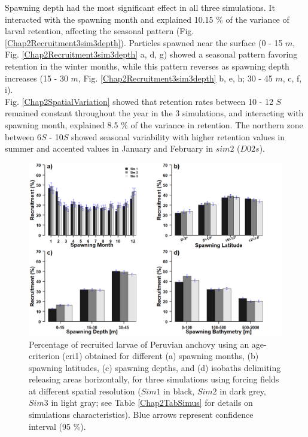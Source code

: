 Spawning depth had the most significant effect in all three simulations. It interacted with the spawning month and explained 10.15 \% of the variance of larval retention, affecting the seasonal pattern (Fig. \ref{Chap2Recruitment3sim3depth}). Particles spawned near the surface (0 - 15 $m$, Fig. \ref{Chap2Recruitment3sim3depth} a, d, g) showed a seasonal pattern favoring retention in the winter months, while this pattern reverses as spawning depth increases (15 - 30 $m$, Fig. \ref{Chap2Recruitment3sim3depth} b, e, h; 30 - 45 $m$, c, f, i).\\

Fig. \ref{Chap2SpatialVariation} showed that retention rates between 10 - 12 \textdegree $S$ remained constant throughout the year in the 3 simulations, and interacting with spawning month, explained 8.5 \% of the variance in retention. The northern zone between 6\textdegree $S$ - 10\textdegree $S$ showed seasonal variability with higher retention values in summer and accented values in January and February in $sim 2$ ($D02s$).\\

\begin{figure}[H]
	\includegraphics[width=1.0\textwidth]{figures/Chap2Recruitment3bars.png}
	\centering
	\caption{Percentage of recruited larvae of Peruvian anchovy using an age-criterion (\gls{cri1}) obtained for different (a) spawning months, (b) spawning latitudes, (c) spawning depths, and (d) isobaths delimiting releasing areas horizontally, for three simulations using forcing fields at different spatial resolution ($Sim 1$ in black, $Sim 2$ in dark grey, $Sim 3$ in light gray; see Table \ref{Chap2TabSimus} for details on simulations characteristics). Blue arrows represent confidence interval (95 \%).}
	\label{Chap2Recruitment3bars}
\end{figure}

